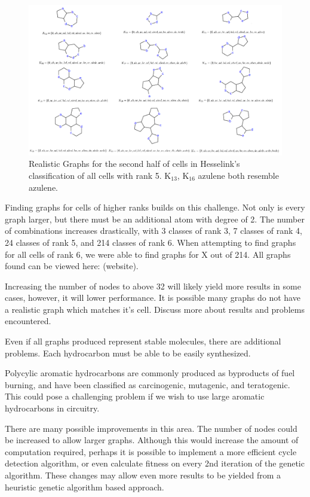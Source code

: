 \documentclass[12pt]{article}
\begin{document}
\begin{figure}[ht!]
\centering
\includegraphics[width=160mm]{rank5Results2.png}
\caption{Realistic Graphs for the second half of cells in Hesselink's classification of all cells with rank 5. K$_{13}$, K$_{16}$ azulene both resemble azulene.}
\label{fig:rank5Results2}
\end{figure}

Finding graphs for cells of higher ranks builds on this challenge. Not only is every graph larger, but there must be an additional atom with degree of 2. The number of combinations increases drastically, with 3 classes of rank 3, 7 classes of rank 4, 24 classes of rank 5, and 214 classes of rank 6. When attempting to find graphs for all cells of rank 6, we were able to find graphs for X out of 214. All graphs found can be viewed here: (website).

Increasing the number of nodes to above 32 will likely yield more results in some cases, however, it will lower performance. It is possible many graphs do not have a realistic graph which matches it's cell. Discuss more about results and problems encountered.

Even if all graphs produced represent stable molecules, there are additional problems. Each hydrocarbon must be able to be easily synthesized. 

Polycylic aromatic hydrocarbons are commonly produced as byproducts of fuel burning, and have been classified as carcinogenic, mutagenic, and teratogenic. This could pose a challenging problem if we wish to use large aromatic hydrocarbons in circuitry. 

There are many possible improvements in this area. The number of nodes could be increased to allow larger graphs. Although this would increase the amount of computation required, perhaps it is possible to implement a more efficient cycle detection algorithm, or even calculate fitness on every 2nd iteration of the genetic algorithm. These changes may allow even more results to be yielded from a heuristic genetic algorithm based approach.
\end{document}
